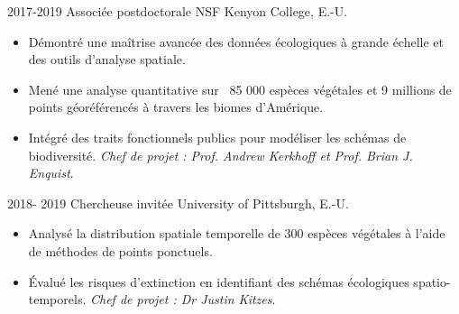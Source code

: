 \documentclass[icon]{twentysecondcv}
\begin{document}
\begin{twenty}
       
 
 
 \twentyitem
    	{2017-2019}
	{Associée postdoctorale NSF}
        {Kenyon College, E.-U.}
        { \begin{itemize}  \small
       
     \item Démontré une maîtrise avancée des données écologiques à grande échelle et des outils d’analyse spatiale.
     \item Mené une analyse quantitative sur ~85 000 espèces végétales et 9 millions de points géoréférencés à travers les biomes d’Amérique.
     \item Intégré des traits fonctionnels publics pour modéliser les schémas de biodiversité. \textit{Chef de projet : Prof. Andrew Kerkhoff et  Prof. Brian J. Enquist}.
     
     \end{itemize}
     }
    
        
             
\twentyitem
    	{2018- 2019}
	{Chercheuse invitée}
        	{University of Pittsburgh, E.-U.}
        	{
        	\begin{itemize}  \small
      \item Analysé la distribution spatiale temporelle de 300 espèces végétales à l’aide de méthodes de points ponctuels.
       \item Évalué les risques d’extinction en identifiant des schémas écologiques spatio-temporels. \textit{Chef de projet : Dr Justin Kitzes}.
     \end{itemize}
     
}
\end{twenty}
\end{document}
